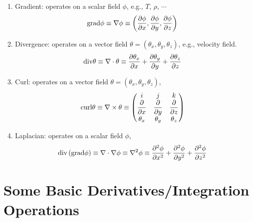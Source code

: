 \begin{enumerate}
%
  \item Gradient: operates on a scalar field $\phi$, e.g., $T$, $\rho$, $\cdots$
     \begin{displaymath}
        \text{grad}\phi \equiv \nabla\phi \equiv \left(\displaystyle\frac{\partial\phi}{\partial x}, \frac{\partial\phi}{\partial y}, \frac{\partial\phi}{\partial z}\right)
     \end{displaymath}
%
  \item Divergence: operates on a vector field  $\theta = \left(\theta_{x}, \theta_{y}, \theta_{z}\right) $, e.g., velocity field.
     \begin{displaymath}
        \text{div}\theta \equiv \nabla\cdot\theta \equiv \displaystyle\frac{\partial\theta_{x}}{\partial x} + \frac{\partial\theta_{y}}{\partial y} + \frac{\partial\theta_{z}}{\partial z}
     \end{displaymath}
%
  \item Curl: operates on a vector field  $\theta = \left(\theta_{x}, \theta_{y}, \theta_{z}\right)$,
     \begin{displaymath}
        \text{curl}\theta \equiv \nabla\times\theta \equiv \begin{pmatrix} i & j & k \\ \displaystyle\frac{\partial}{\partial x} & \displaystyle\frac{\partial}{\partial y} & \displaystyle\frac{\partial}{\partial z} \\ \theta_{x} & \theta_{y} & \theta_{z} \end{pmatrix}
     \end{displaymath}
%
   \item Laplacian: operates on a scalar field $\phi$,
      \begin{displaymath}
         \text{div}\left(\text{grad}\phi\right) \equiv \nabla\cdot\nabla\phi \equiv \nabla^{2}\phi \equiv \displaystyle\frac{\partial^{2}\phi}{\partial x^{2}} + \displaystyle\frac{\partial^{2}\phi}{\partial y^{2}} + \displaystyle\frac{\partial^{2}\phi}{\partial z^{2}}
      \end{displaymath}
%
\end{enumerate}


\section{Some Basic Derivatives/Integration Operations}

